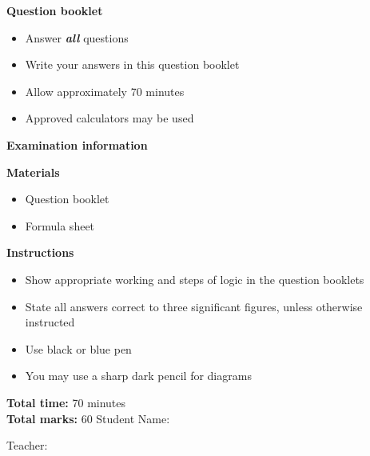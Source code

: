 \begin{coverpages}
{    \vspace{1cm}    %
    \textbf{Question booklet}
    \begin{itemize}
        \item Answer \textbf{\textit{all}} questions
        \item Write your answers in this question booklet
        \item Allow approximately 70 minutes
        \item Approved calculators may be used
    \end{itemize}
    \vfill
    \textbf{Examination information}\par
    \textbf{Materials}
    \begin{itemize}
        \item Question booklet
        \item Formula sheet
    \end{itemize}
    \textbf{Instructions}
    \begin{itemize}
        \item Show appropriate working and steps of logic in the question booklets
        \item State all answers correct to three significant figures, unless otherwise instructed
        \item Use black or blue pen
        \item You may use a sharp dark pencil for diagrams
    \end{itemize}
    \textbf{Total time:} 70 minutes\\
    \textbf{Total marks:} 60
    \vfill
    Student Name:\ \parbox[b][2em][b]{6cm}{\dotfill}
    \hfill
    Teacher:\ \parbox[b][2em][b]{5cm}{\dotfill}
    
}
\end{coverpages}
\addtocounter{page}{1}

